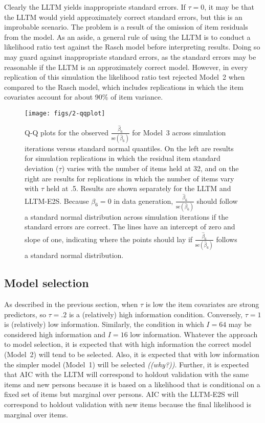 Clearly the LLTM yields inappropriate standard errors. If $\tau = 0$, it may be that the LLTM would yield approximately correct standard errors, but this is an improbable scenario. The problem is a result of the omission of item residuals from the model. As an aside, a general rule of using the LLTM is to conduct a likelihood ratio test against the Rasch model before interpreting results. Doing so may guard against inappropriate standard errors, as the standard errors may be reasonable if the LLTM is an approximately correct model. However, in every replication of this simulation the likelihood ratio test rejected Model~2 when compared to the Rasch model, which includes replications in which the item covariates account for about 90\% of item variance.

\begin{figure}
	\centering
	\texttt{[image: figs/2-qqplot]}
	\caption{Q-Q plots for the observed $\frac{\hat \beta_6}{\mathrm{se}(\hat \beta_6)}$ for Model~3 across simulation iterations versus standard normal quantiles. On the left are results for simulation replications in which the residual item standard deviation ($\tau$) varies with the number of items held at 32, and on the right are results for replications in which the number of items vary with $\tau$ held at .5. Results are shown separately for the LLTM and LLTM-E2S. Because $\beta_6 = 0$ in data generation, $\frac{\hat \beta_6}{\mathrm{se}(\hat \beta_6)}$ should follow a standard normal distribution across simulation iterations if the standard errors are correct. The lines have an intercept of zero and slope of one, indicating where the points should lay if $\frac{\hat \beta_6}{\mathrm{se}(\hat \beta_6)}$ follows a standard normal distribution.}
	\label{fig:2-qqplot}
\end{figure}


\subsection{Model selection}

As described in the previous section, when $\tau$ is low the item covariates are strong predictors, so $\tau = .2$ is a (relatively) high information condition. Conversely, $\tau = 1$ is (relatively) low information. Similarly, the condition in which $I=64$ may be considered high information and $I=16$ low information. Whatever the approach to model selection, it is expected that with high information the correct model (Model~2) will tend to be selected. Also, it is expected that with low information the simpler model (Model~1) will be selected \emph{((why?))}. 
Further, it is expected that AIC with the LLTM will correspond to holdout validation with the same items and new persons because it is based on a likelihood that is conditional on a fixed set of items but marginal over persons.
AIC with the LLTM-E2S will correspond to holdout validation with new items because the final likelihood is marginal over items.

